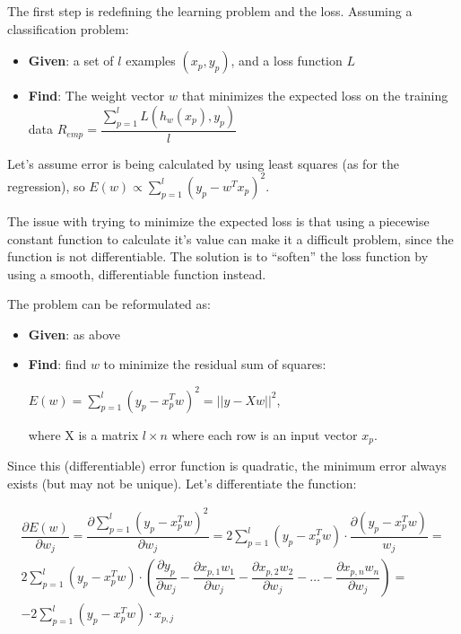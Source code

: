 The first step is redefining the learning problem and the loss. Assuming a classification problem:

\begin{itemize}
    \item \textbf{Given}: a set of $l$ examples $(x_p, y_p)$, and a loss function $L$

    \item \textbf{Find}: The weight vector $w$ that minimizes the expected loss on the training data $R_{emp} = \dfrac{\sum_{p=1}^l L(h_w(x_p), y_p)}{l}$
\end{itemize}
Let's assume error is being calculated by using least squares (as for the regression), so $E(w) \propto \sum_{p=1}^l (y_p - w^Tx_p)^2$.

The issue with trying to minimize the expected loss is that using a piecewise constant function to calculate it's value can make it a difficult problem, since the function is not differentiable. The solution is to ``soften'' the loss function by using a smooth, differentiable function instead.

The problem can be reformulated as:

\begin{itemize}
    \item \textbf{Given}: as above

    \item \textbf{Find}: find $w$ to minimize the residual sum of squares:

    $E(w) = \sum_{p=1}^l (y_p - x_p^Tw)^2 = ||y-Xw||^2$,

    where X is a matrix $l \times n$ where each row is an input vector $x_p$.
\end{itemize}

Since this (differentiable) error function is quadratic, the minimum error always exists (but may not be unique). Let's differentiate the function:

\begin{equation*}
\begin{gathered}
    \dfrac{\partial E(w)}{\partial w_j} = \dfrac{\partial \sum_{p=1}^l (y_p - x_p^Tw)^2}{\partial w_j} = 2\sum_{p=1}^l (y_p - x_p^Tw) \cdot \dfrac{\partial (y_p - x_p^Tw)}{w_j} = \\ 2\sum_{p=1}^l (y_p - x_p^Tw) \cdot (\dfrac{\partial y_p}{\partial w_j} - \dfrac{\partial x_{p,1}w_1}{\partial w_j} - \dfrac{\partial x_{p,2}w_2}{\partial w_j} - \dots - \dfrac{\partial x_{p,n}w_n}{\partial w_j}) = \\ \boxed{-2\sum_{p=1}^l (y_p - x_p^Tw) \cdot x_{p,j}}
\end{gathered}
\end{equation*}

